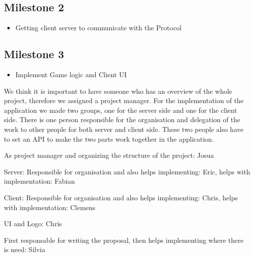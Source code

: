 \documentclass{report}
\begin{document}
\subsection{Milestone 2}
\begin{itemize}
	\item Getting client server to communicate with the Protocol
\end{itemize}

\subsection{Milestone 3}
\begin{itemize}
	\item Implement Game logic and Client UI
\end{itemize}


We think it is important to have someone who has an overview of the whole project, therefore we assigned a project manager. For the implementation of the application we made two groups, one for the server side and one for the client side. There is one person responsible for the organisation and delegation of the work to other people for both server and client side. These two people also have to set an API to make the two parts work together in the application.

As project manager and organizing the structure of the project: Josua

Server: Responsible for organisation and also helps implementing: Eric, helps with implementation: Fabian

Client: Responsible for organisation and also helps implementing: Chris, helps with implementation: Clemens

UI and Logo: Chris

First responsable for writing the proposal, then helps implementing where there is need: Silvia




\end{document}
